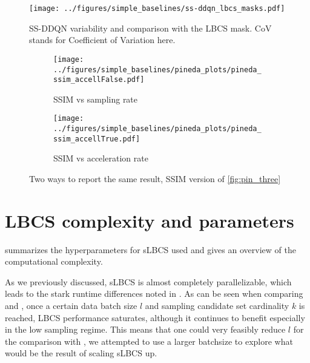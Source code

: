 \begin{figure}
    \centering
    \texttt{[image: ../figures/simple\_baselines/ss-ddqn\_lbcs\_masks.pdf]}
    \caption{SS-DDQN variability and comparison with the LBCS mask. CoV stands for Coefficient of Variation here.}
    \label{fig:ssddqn_lbcs}
    \vspace{-.4cm}
\end{figure}

\begin{figure}[!ht]
    \centering
    \begin{subfigure}[b]{0.49\textwidth}
    \centering
    \texttt{[image: ../figures/simple\_baselines/pineda\_plots/pineda\_ssim\_accellFalse.pdf]}
    \caption{SSIM vs sampling rate}
    \label{fig:ssim_vs_sampling}
    \end{subfigure}
    \hfill
    \begin{subfigure}[b]{0.49\textwidth}
    \centering
    \texttt{[image: ../figures/simple\_baselines/pineda\_plots/pineda\_ssim\_accellTrue.pdf]}
    \caption{SSIM vs acceleration rate}
    \label{fig:ssim_acceleration_rate}
    \end{subfigure}
    \vspace{-.2cm}
    \caption{Two ways to report the same result, SSIM version of \cref{fig:pin_three}}
    \vspace{-.4cm}
    \label{fig:pin_three_ssim}
\end{figure}



\clearpage
\FloatBarrier

\section{LBCS complexity and parameters}
\label{app:lbcs}

 summarizes the hyperparameters for sLBCS used and  gives an overview of the computational complexity.

As we previously discussed, sLBCS is almost completely parallelizable, which leads to the stark runtime differences noted in . As can be seen when comparing  and , once a certain data batch size $l$ and sampling candidate set cardinality $k$ is reached, LBCS performance saturates, although it continues to benefit especially in the low sampling regime.
This means that one could very feasibly reduce $l$ for the comparison with \citet{bakker2020experimental}, we attempted to use a larger batchsize to explore what would be the result of scaling sLBCS up.

